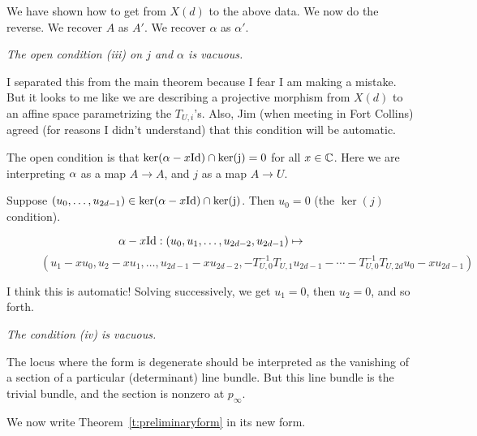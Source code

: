 {\bpf
We have shown how to get from $X(d)$ to the above data.  We now do the reverse.
We recover $A$ as $A'$.  We recover $\alpha$ as $\alpha'$.  \epf


 {\em The open condition (iii) on
  $j$ and $\alpha$  is vacuous.}

I separated this from the main theorem because I fear I am making
a mistake.  But it looks to me like we are describing a projective
morphism from $X(d)$ to an affine space parametrizing the $T_{U,i}$'s.
Also, Jim (when meeting in Fort Collins) agreed (for reasons I didn't understand)
that this condition will be automatic.

\bpf
The open condition is that $\ker(\alpha -x \rm{Id}) \cap \ker(j) =0$
for all $x \in \mathbb{C}$.  Here we are interpreting $\alpha$ as a map $A \rightarrow A$,
and $j$ as a map $A \rightarrow U$.

Suppose $(u_0, \dots, u_{2d-1}) \in \ker(\alpha -x \rm{Id}) \cap \ker(j)$.
Then $u_0=0$ (the $\ker(j)$ condition).

$${\alpha-x\rm{Id}}: (u_0, u_1, \dots, u_{2d-2}, u_{2d-1}) \mapsto$$
$$ \quad \quad \quad
 (u_1-xu_0, u_2-xu_1, \dots, u_{2d-1} - x u_{2d-2},
 -T^{-1}_{U,0} T_{U,1} u_{2d-1}  - \cdots  -T^{-1}_{U,0} T_{U,2d} u_0 -xu_{2d-1})$$

 I think this is automatic!  Solving successively, we get $u_1=0$, then $u_2=0$, and so forth.

 \epf

 {\em The condition (iv) is vacuous.}

\bpf  The locus where the form is degenerate should be interpreted as the vanishing of a section of a particular (determinant) line bundle.  But this line bundle is the trivial bundle, and the section is nonzero at $p_\infty$. \epf

We now write Theorem~\ref{t:preliminaryform} in its new form.

}
